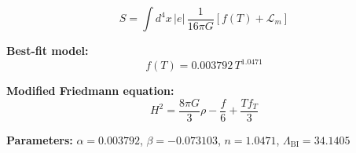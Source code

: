 
\begin{equation}
  S = \int d^4x \, |e| \, \frac{1}{16\pi G} \left[ f(T) + \mathcal{L}_m \right]
\end{equation}

\textbf{Best-fit model:}
\begin{equation}
  f(T) = 0.003792 \, T^{1.0471}
\end{equation}

\textbf{Modified Friedmann equation:}
\begin{equation}
  H^2 = \frac{8\pi G}{3} \rho - \frac{f}{6} + \frac{T f_T}{3}
\end{equation}

\textbf{Parameters:}
$\alpha = 0.003792$, \quad
$\beta = -0.073103$, \quad
$n = 1.0471$, \quad
$\Lambda_{\text{BI}} = 34.1405$